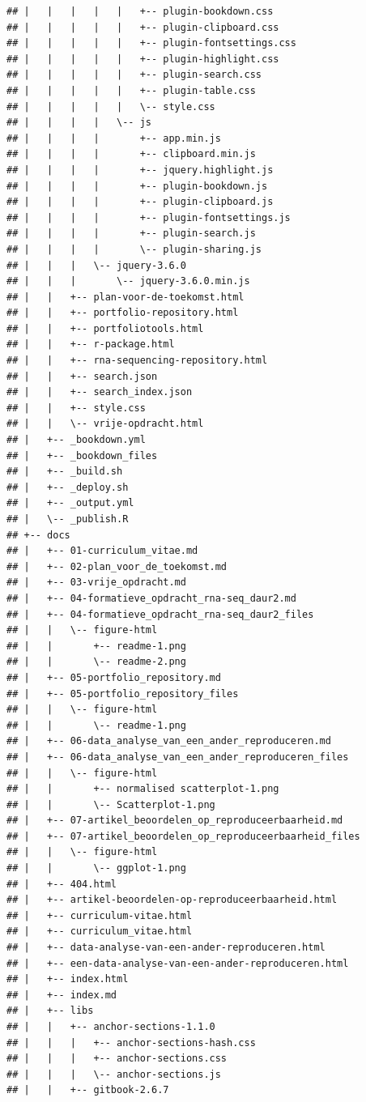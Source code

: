 \documentclass[
]{book}
\begin{document}
\begin{verbatim}
## |   |   |   |   |   +-- plugin-bookdown.css
## |   |   |   |   |   +-- plugin-clipboard.css
## |   |   |   |   |   +-- plugin-fontsettings.css
## |   |   |   |   |   +-- plugin-highlight.css
## |   |   |   |   |   +-- plugin-search.css
## |   |   |   |   |   +-- plugin-table.css
## |   |   |   |   |   \-- style.css
## |   |   |   |   \-- js
## |   |   |   |       +-- app.min.js
## |   |   |   |       +-- clipboard.min.js
## |   |   |   |       +-- jquery.highlight.js
## |   |   |   |       +-- plugin-bookdown.js
## |   |   |   |       +-- plugin-clipboard.js
## |   |   |   |       +-- plugin-fontsettings.js
## |   |   |   |       +-- plugin-search.js
## |   |   |   |       \-- plugin-sharing.js
## |   |   |   \-- jquery-3.6.0
## |   |   |       \-- jquery-3.6.0.min.js
## |   |   +-- plan-voor-de-toekomst.html
## |   |   +-- portfolio-repository.html
## |   |   +-- portfoliotools.html
## |   |   +-- r-package.html
## |   |   +-- rna-sequencing-repository.html
## |   |   +-- search.json
## |   |   +-- search_index.json
## |   |   +-- style.css
## |   |   \-- vrije-opdracht.html
## |   +-- _bookdown.yml
## |   +-- _bookdown_files
## |   +-- _build.sh
## |   +-- _deploy.sh
## |   +-- _output.yml
## |   \-- _publish.R
## +-- docs
## |   +-- 01-curriculum_vitae.md
## |   +-- 02-plan_voor_de_toekomst.md
## |   +-- 03-vrije_opdracht.md
## |   +-- 04-formatieve_opdracht_rna-seq_daur2.md
## |   +-- 04-formatieve_opdracht_rna-seq_daur2_files
## |   |   \-- figure-html
## |   |       +-- readme-1.png
## |   |       \-- readme-2.png
## |   +-- 05-portfolio_repository.md
## |   +-- 05-portfolio_repository_files
## |   |   \-- figure-html
## |   |       \-- readme-1.png
## |   +-- 06-data_analyse_van_een_ander_reproduceren.md
## |   +-- 06-data_analyse_van_een_ander_reproduceren_files
## |   |   \-- figure-html
## |   |       +-- normalised scatterplot-1.png
## |   |       \-- Scatterplot-1.png
## |   +-- 07-artikel_beoordelen_op_reproduceerbaarheid.md
## |   +-- 07-artikel_beoordelen_op_reproduceerbaarheid_files
## |   |   \-- figure-html
## |   |       \-- ggplot-1.png
## |   +-- 404.html
## |   +-- artikel-beoordelen-op-reproduceerbaarheid.html
## |   +-- curriculum-vitae.html
## |   +-- curriculum_vitae.html
## |   +-- data-analyse-van-een-ander-reproduceren.html
## |   +-- een-data-analyse-van-een-ander-reproduceren.html
## |   +-- index.html
## |   +-- index.md
## |   +-- libs
## |   |   +-- anchor-sections-1.1.0
## |   |   |   +-- anchor-sections-hash.css
## |   |   |   +-- anchor-sections.css
## |   |   |   \-- anchor-sections.js
## |   |   +-- gitbook-2.6.7

\end{verbatim}
\end{document}
